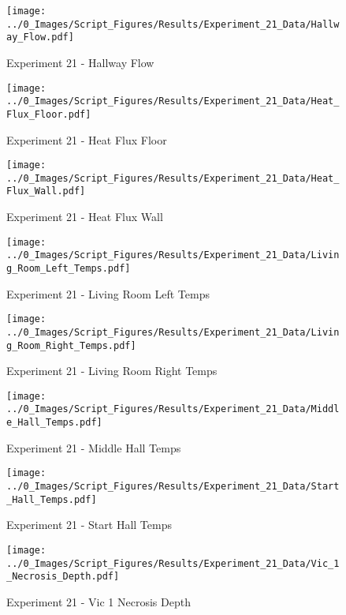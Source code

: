 	\clearpage

	\begin{figure}[H]
		\centering
		\texttt{[image: ../0\_Images/Script\_Figures/Results/Experiment\_21\_Data/Hallway\_Flow.pdf]}
		\caption[]{Experiment 21 - Hallway Flow}
	\end{figure}
 

	\begin{figure}[H]
		\centering
		\texttt{[image: ../0\_Images/Script\_Figures/Results/Experiment\_21\_Data/Heat\_Flux\_Floor.pdf]}
		\caption[]{Experiment 21 - Heat Flux Floor}
	\end{figure}
 
	\clearpage

	\begin{figure}[H]
		\centering
		\texttt{[image: ../0\_Images/Script\_Figures/Results/Experiment\_21\_Data/Heat\_Flux\_Wall.pdf]}
		\caption[]{Experiment 21 - Heat Flux Wall}
	\end{figure}
 

	\begin{figure}[H]
		\centering
		\texttt{[image: ../0\_Images/Script\_Figures/Results/Experiment\_21\_Data/Living\_Room\_Left\_Temps.pdf]}
		\caption[]{Experiment 21 - Living Room Left Temps}
	\end{figure}
 
	\clearpage

	\begin{figure}[H]
		\centering
		\texttt{[image: ../0\_Images/Script\_Figures/Results/Experiment\_21\_Data/Living\_Room\_Right\_Temps.pdf]}
		\caption[]{Experiment 21 - Living Room Right Temps}
	\end{figure}
 

	\begin{figure}[H]
		\centering
		\texttt{[image: ../0\_Images/Script\_Figures/Results/Experiment\_21\_Data/Middle\_Hall\_Temps.pdf]}
		\caption[]{Experiment 21 - Middle Hall Temps}
	\end{figure}
 
	\clearpage

	\begin{figure}[H]
		\centering
		\texttt{[image: ../0\_Images/Script\_Figures/Results/Experiment\_21\_Data/Start\_Hall\_Temps.pdf]}
		\caption[]{Experiment 21 - Start Hall Temps}
	\end{figure}
 

	\begin{figure}[H]
		\centering
		\texttt{[image: ../0\_Images/Script\_Figures/Results/Experiment\_21\_Data/Vic\_1\_Necrosis\_Depth.pdf]}
		\caption[]{Experiment 21 - Vic 1 Necrosis Depth}
	\end{figure}
 
